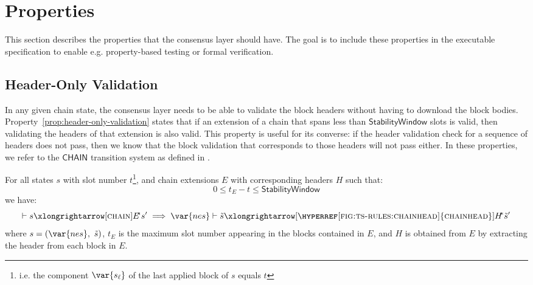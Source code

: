\newcommand{\Val}{\fun{Val}}
\newcommand{\POV}[1]{\ensuremath{\mathsf{PresOfVal}(\mathsf{#1})}}
\newcommand{\DBE}[2]{\ensuremath{\mathsf{DBE}({#1},~{#2})}}
\newcommand{\DGO}[2]{\ensuremath{\mathsf{DGO}({#1},~{#2})}}
\newcommand{\transtar}[2]{\xlongrightarrow[\textsc{#1}]{#2}\negthickspace^{*}}
\newcommand{\StabilityWindow}{\ensuremath{\mathsf{StabilityWindow}}}

\section{Properties}
\label{sec:properties}

This section describes the properties that the consensus layer should have.
The goal is to include these properties in the executable specification
to enable e.g. property-based testing or formal verification.

\subsection{Header-Only Validation}
\label{sec:header-only-validation}
In any given chain state, the consensus layer needs to be able to validate the
block headers without having to download the block bodies.
Property~\ref{prop:header-only-validation} states that if an extension of a
chain that spans less than $\StabilityWindow$ slots is valid, then validating the
headers of that extension is also valid. This property is useful for its
converse: if the header validation check for a sequence of headers does not
pass, then we know that the block validation that corresponds to those headers
will not pass either. In these properties, we refer to the $\mathsf{CHAIN}$
transition system as defined in \cite{shelley_chain_spec}.

\begin{property}\label{prop:header-only-validation}
  For all states $s$ with slot number $t$\footnote{i.e. the
    component $\var{s_\ell}$ of the last applied block of $s$ equals $t$},
    and chain extensions $E$ with corresponding headers $H$ such that:
  $$
  0 \leq t_E - t  \leq \StabilityWindow
  $$
  we have:
  $$
  \vdash s \transtar{chain}{E} s'
  \implies
  \var{nes} \vdash \tilde{s} \transtar{\hyperref[fig:ts-rules:chainhead]{chainhead}}{H} \tilde{s}'
  $$
  where $s=(\var{nes},~\tilde{s})$,
  $t_E$ is the maximum slot number appearing in the blocks contained in
  $E$, and $H$ is obtained from $E$ by extracting the header from each block in $E$.
\end{property}

